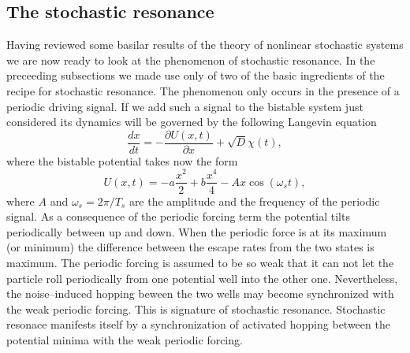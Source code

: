 \subsection{The stochastic resonance}
Having reviewed some basilar results of the theory of nonlinear stochastic
systems we are now ready to look at the phenomenon of stochastic resonance.
In the preceeding subsections we made use only of two of the basic ingredients
of the recipe for stochastic resonance. The phenomenon only occurs in the
presence of a periodic driving signal. If we add such a signal to the bistable
system just considered its dynamics will be governed by the following Langevin
equation
\begin{equation}
  \frac{dx}{dt} = - \frac{\partial U(x,t)}{\partial x} + \sqrt{D} \chi(t), 
\end{equation}
where the bistable potential takes now the form
\begin{equation}
\label{eq:bistablepotential}
  U(x,t) = -a \frac{x^2}{2} +b \frac{x^4}{4} - Ax \cos(\omega_s t),
\end{equation}
where $A$ and $\omega_s= 2 \pi/T_s$ are the amplitude 
and the frequency of the periodic
signal. As a consequence of the periodic forcing term the potential tilts
periodically between up  and down. When the periodic force is at its
maximum (or minimum)  the difference between the escape rates from the two
states is maximum. The periodic forcing is assumed to be so
weak that it can not let the particle roll periodically from one potential
well into the other one. Nevertheless, the noise--induced hopping beween the
two wells  may become synchronized with the weak periodic forcing. This is 
signature of stochastic resonance. Stochastic resonace manifests itself by a
synchronization of activated hopping between the potential minima with the
weak periodic forcing. 

